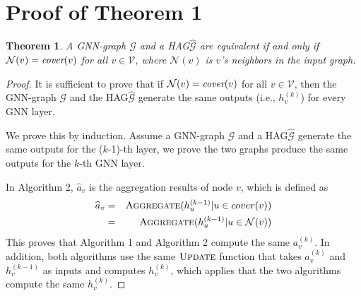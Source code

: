 \documentclass{article}
\newcommand{\er}[1]{\mbox{\rm\em #1}}
\newcommand{\xg}{HAG\xspace}
\newcommand{\mw}[1] {\mathcal{\widehat{#1}}}
\newcommand{\m}[1] {\mathcal{#1}}
\newtheorem{theorem}{Theorem}
\begin{document}
\section{Proof of Theorem 1}
\begin{theorem}
\label{thm2}
A GNN-graph $\m{G}$ and a \xg $\mw{G}$ are equivalent if and only if $\mathcal{N}(v) = \er{cover}(v)$ for all $v \in \m{V}$, where $\mathcal{N}(v)$ is $v$'s neighbors in the input graph.
\end{theorem}
\begin{proof}
It is sufficient to prove that if $\mathcal{N}(v) = \er{cover}(v)$ for all $v \in \m{V}$, then the GNN-graph $\m{G}$ and the \xg $\mw{G}$ generate the same outputs (i.e., $h_v^{(k)}$) for every GNN layer. 

We prove this by induction. Assume a GNN-graph $\m{G}$ and a \xg $\mw{G}$ generate the same outputs for the ($k$-1)-th layer, we prove the two graphs produce the same outputs for the $k$-th GNN layer.

In Algorithm 2, $\widehat{a}_v$ is the aggregation results of node $v$, which is defined as
\begin{eqnarray*}
\widehat{a}_v & = & \textproc{Aggregate}(h_u^{(k-1)} | u \in cover(v)) \\
& = & \textproc{Aggregate}(h_u^{(k-1)} | u \in \m{N}(v))
\end{eqnarray*}
This proves that Algorithm 1 and Algorithm 2 compute the same $a^{(k)}_v$. 
In addition, both algorithms use the same $\textproc{Update}$ function that takes $a^{(k)}_v$ and $h^{(k-1)}_v$ as inputs and computes $h^{(k)}_v$, which applies that the two algorithms compute the same $h^{(k)}_v$.
\end{proof}
\end{document}
